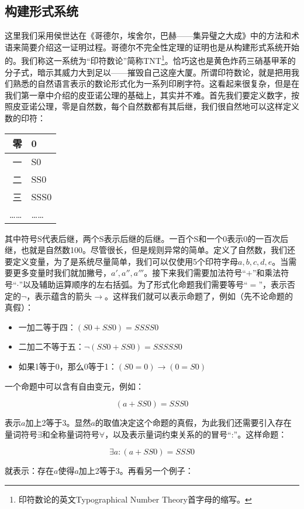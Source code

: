 \documentclass{article}
\begin{document}
\subsection{构建形式系统}
这里我们采用侯世达在《哥德尔，埃舍尔，巴赫——集异璧之大成》中的方法和术语来简要介绍这一证明过程。哥德尔不完全性定理的证明也是从构建形式系统开始的。我们称这一系统为“印符数论”简称TNT\footnote{印符数论的英文Typographical Number Theory首字母的缩写。}。恰巧这也是黄色炸药三硝基甲苯的分子式，暗示其威力大到足以——摧毁自己这座大厦。所谓印符数论，就是把用我们熟悉的自然语言表示的数论形式化为一系列印刷字符。这看起来很复杂，但是在我们第一章中介绍的皮亚诺公理的基础上，其实并不难。首先我们要定义数字，按照皮亚诺公理，零是自然数，每个自然数都有其后继，我们很自然地可以这样定义数的印符：

\begin{tabular}{|r|l|}
零 & 0 \\
\hline
一 & S0 \\
\hline
二 & SS0 \\
\hline
三 & SSS0 \\
\hline
…… & …… \\
\end{tabular}

其中符号S代表后继，两个S表示后继的后继。一百个S和一个0表示0的一百次后继，也就是自然数100。尽管很长，但是规则异常的简单。定义了自然数，我们还要定义变量，为了是系统尽量简单，我们可以仅使用5个印符字母$a, b, c, d, e$。当需要更多变量时我们就加撇号，$a', a'', a'''$。接下来我们需要加法符号“$+$”和乘法符号“$\cdot$”以及辅助运算顺序的左右括弧。为了形式化命题我们需要等号“$=$”，表示否定的$\lnot$，表示蕴含的箭头$\to$。这样我们就可以表示命题了，例如（先不论命题的真假）：

\begin{itemize}
\item 一加二等于四：$(S0 + SS0) = SSSS0$
\item 二加二不等于五：$\lnot (SS0 + SS0) = SSSSS0$
\item 如果1等于0，那么0等于1：$(S0 = 0) \to (0 = S0)$
\end{itemize}

一个命题中可以含有自由变元，例如：

\[
(a + SS0) = SSS0
\]

表示$a$加上2等于3。显然$a$的取值决定这个命题的真假，为此我们还需要引入存在量词符号$\exists$和全称量词符号$\forall$，以及表示量词约束关系的的冒号“:”。这样命题：

\[
\exists a : (a + SS0) = SSS0
\]

就表示：存在$a$使得$a$加上2等于3。再看另一个例子：
\end{document}

